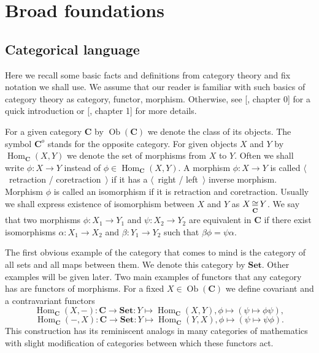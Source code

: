 
\section{
  Broad foundations}\label{SectionBroadFoundations} 


\subsection{
  Categorical language}\label{SubSectionCategoricalLanguage}

Here we recall some basic facts and definitions from category theory and fix
notation we shall use. We assume that our reader is familiar with such basics of
category theory as category, functor, morphism. Otherwise, see
[\cite{HelLectAndExOnFuncAn}, chapter 0] for a quick introduction or
[\cite{KashivShapCatsAndSheavs}, chapter 1] for more details.

For a given category $\mathbf{C}$ by $\operatorname{Ob}(\mathbf{C})$ we denote
the class of its objects. The symbol $\mathbf{C}^o$ stands for the opposite
category. For given objects $X$ and $Y$ by 
$\operatorname{Hom}_{\mathbf{C}}(X, Y)$ 
we denote the set of morphisms from $X$ to $Y$. Often we shall write
$\phi:X\to Y$ instead of $\phi\in\operatorname{Hom}_{\mathbf{C}}(X,Y)$. A
morphism $\phi:X\to Y$ is called $\langle$~retraction / coretraction~$\rangle$
if it has a $\langle$~right / left~$\rangle$ inverse morphism. Morphism $\phi$
is called an isomorphism if it is retraction and coretraction. Usually we shall
express existence of isomorphism between $X$ and $Y$ as $X\mathop{\mathbin{\cong}}\limits_{\mathbf{C}} Y$.
We say that two morphisms $\phi:X_1\to Y_1$ and $\psi:X_2\to Y_2$ are equivalent
in $\mathbf{C}$ if there exist isomorphisms $\alpha:X_1\to X_2$ and
$\beta:Y_1\to Y_2$ such that $\beta\phi=\psi\alpha$.

The first obvious example of the category that comes to mind is the category of
all sets and all maps between them. We denote this category by $\mathbf{Set}$.
Other examples will be given later. Two main examples of functors that any
category has are functors of morphisms. For a fixed
$X\in\operatorname{Ob}(\mathbf{C})$ we define covariant and a contravariant
functors
$$
\operatorname{Hom}_{\mathbf{C}}(X,-)
:\mathbf{C}\to\mathbf{Set}:Y\mapsto \operatorname{Hom}_{\mathbf{C}}(X,Y), 
\phi\mapsto(\psi\mapsto \phi\psi),
$$
$$
\operatorname{Hom}_{\mathbf{C}}(-,X)
:\mathbf{C}\to\mathbf{Set}:Y\mapsto \operatorname{Hom}_{\mathbf{C}}(Y,X), 
\phi\mapsto(\psi\mapsto \psi\phi).
$$
This construction has its reminiscent analogs in many categories of mathematics
with slight modification of categories between which these functors act.

